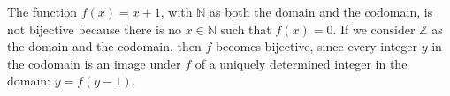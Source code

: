 The function $f(x)=x+1$, with $\mathbb{N}$ as both the domain and the codomain, is not bijective because there is no $x\in\mathbb{N}$ such that $f(x)=0$.
If we consider $\mathbb{Z}$ as the domain and the codomain, then $f$ becomes bijective, since every integer $y$ in the codomain is an image under $f$ of a uniquely determined integer in the domain: $y=f(y-1)$.
